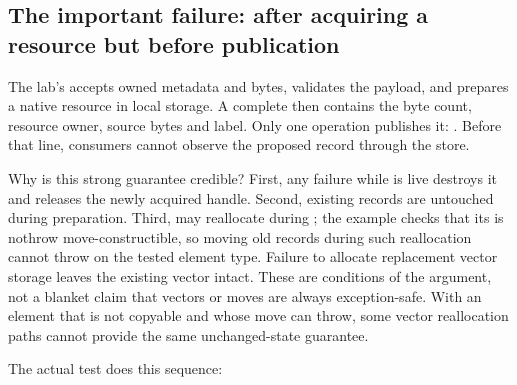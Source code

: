 \subsection{The important failure: after acquiring a resource but before publication}\label{01-foundations-i-ch004-the-important-failure-after-acquiring-a-resource-but-before-publication}

\hypertarget{01-foundations-i-ch004-the-important-failure-after-acquiring-a-resource-but-before-publication}{}

The lab's  accepts owned metadata and bytes, validates the payload, and prepares a native resource in local storage. A complete  then contains the byte count, resource owner, source bytes and label. Only one operation publishes it: . Before that line, consumers cannot observe the proposed record through the store.

Why is this strong guarantee credible? First, any failure while  is live destroys it and releases the newly acquired handle. Second, existing records are untouched during preparation. Third,  may reallocate during ; the example checks that its  is nothrow move-constructible, so moving old records during such reallocation cannot throw on the tested element type. Failure to allocate replacement vector storage leaves the existing vector intact. These are conditions of the argument, not a blanket claim that vectors or moves are always exception-safe. With an element that is not copyable and whose move can throw, some vector reallocation paths cannot provide the same unchanged-state guarantee.

The actual test does this sequence:

